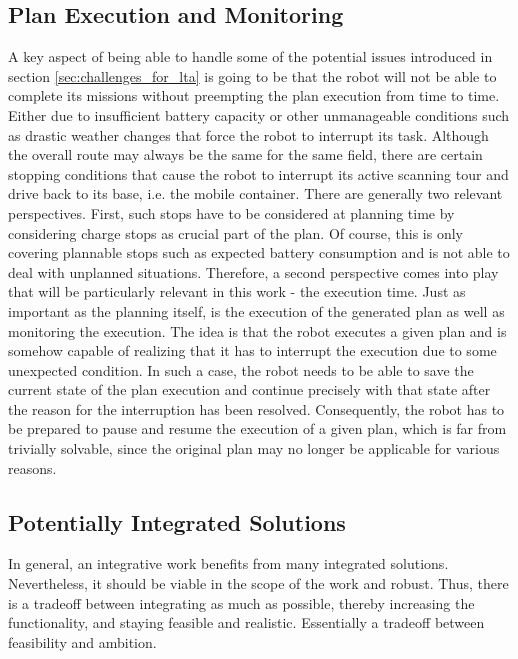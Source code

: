 \documentclass[english, master, expose, utf8]{base/thesis_KBS}
\begin{document}
\subsection{Plan Execution and Monitoring}

A key aspect of being able to handle some of the potential issues introduced in section \ref{sec:challenges_for_lta} is going to be that the robot will not be able to
complete its missions without preempting the plan execution from time to time. Either due to insufficient battery capacity or other unmanageable conditions such as 
drastic weather changes that force the robot to interrupt its task. Although the overall route may always be the same for the same field, there are certain stopping
conditions that cause the robot to interrupt its active scanning tour and drive back to its base, i.e. the mobile container.
There are generally two relevant perspectives. First, such stops have to be considered at planning time by considering charge stops as crucial part of the plan.
Of course, this is only covering plannable stops such as expected battery consumption and is not able to deal with unplanned situations.
Therefore, a second perspective comes into play that will be particularly relevant in this work - the execution time.
Just as important as the planning itself, is the execution of the generated plan as well as monitoring the execution.
The idea is that the robot executes a given plan and is somehow capable of realizing that it has to interrupt the execution due to some unexpected condition.
In such a case, the robot needs to be able to save the current state of the plan execution and continue precisely with that state after the reason 
for the interruption has been resolved. Consequently, the robot has to be prepared to pause and resume the execution of a given plan, which is far from 
trivially solvable, since the original plan may no longer be applicable for various reasons.

\subsection{Potentially Integrated Solutions}

In general, an integrative work benefits from many integrated solutions. Nevertheless, it should be viable in the scope of the work and robust.
Thus, there is a tradeoff between integrating as much as possible, thereby increasing the functionality, and staying feasible and realistic.
Essentially a tradeoff between feasibility and ambition.
\end{document}
